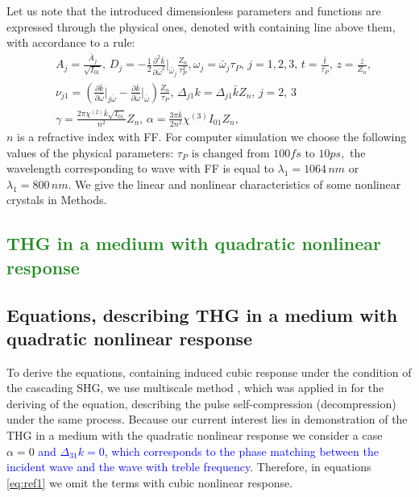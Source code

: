 \documentclass[a4paper, 12pt, onecolumn]{extarticle}
\begin{document}
 Let us note that the introduced dimensionless parameters and functions are expressed through the physical ones, denoted with containing line above them, with accordance to a rule:
\begin{equation}
\label{eq:pars}
\begin{aligned}
&A_j=\frac{\bar{A}_j}{\sqrt{I_{01}}},\,D_j=-\frac{1}{2}\frac{\partial^2 \bar{k}}{\partial \bar{\omega}^2}\Big|_{\bar{\omega}_j}\frac{Z_n}{\tau_P^2},\omega_j=\bar{\omega}_j\tau_P,\,j=1,2,3,\,t=\frac{\bar{t}}{\tau_P},\,z=\frac{\bar{z}}{Z_n},\\
&\nu_{j1}=\left(\frac{\partial \bar{k}}{\partial \bar{\omega}}\Big|_{j\bar{\omega}}-\frac{\partial \bar{k}}{\partial \bar{\omega}}\Big|_{\bar{\omega}}\right)\frac{Z_n}{\tau_P},\,\Delta_{j1}k=\Delta_{j1}\bar{k}Z_n,\,j=2,\,3\\
&\gamma=\frac{2\pi\chi^{(2)}\bar{k}\sqrt{I_{01}}}{n^2}Z_n,\,\alpha=\frac{3\pi \bar{k}}{2n^2}\chi^{(3)}I_{01} Z_n,
\end{aligned}
\end{equation}
$n$ is a refractive index with FF. For computer simulation we choose the following values of the physical parameters: \(\tau_P \text{ is changed from } 100fs\text{ to }10ps,\) the wavelength corresponding to wave with FF is equal to \(\lambda_1=1064\,nm\) or \(\lambda_1=800\,nm\). We give the linear and nonlinear characteristics of some nonlinear crystals in Methods.
\textcolor{ForestGreen}{\section{THG in a medium with quadratic nonlinear response}}
\subsection{Equations, describing THG in a medium with quadratic nonlinear response}
To derive the equations, containing induced cubic response under the condition of the cascading SHG, we use multiscale method \cite{bib:n24}, which was applied in \cite{bib:n19} for the deriving of the equation, describing the pulse self-compression (decompression) under the same process. Because our current interest lies in demonstration of the THG in a medium with the quadratic nonlinear response we consider a case \(\alpha=0\) \textcolor{blue}{and \(\Delta_{31}k=0\), which corresponds to the phase matching between the incident wave and the wave with treble frequency}. Therefore, in equations \eqref{eq:ref1} we omit the terms with cubic nonlinear response.
\end{document}
